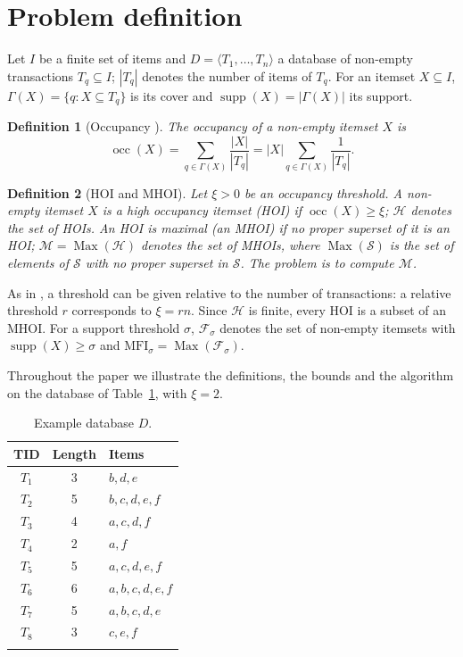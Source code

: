 \documentclass[pdflatex,sn-mathphys,Numbered]{sn-jnl}
\theoremstyle{thmstyleone}
\theoremstyle{thmstyletwo}
\theoremstyle{thmstylethree}
\newtheorem{definition}{Definition}
\newcommand{\supp}{\operatorname{supp}}
\newcommand{\occ}{\operatorname{occ}}
\newcommand{\HOI}{\mathcal{H}}
\newcommand{\MHOI}{\mathcal{M}}
\newcommand{\FI}{\mathcal{F}}
\newcommand{\MFI}{\mathrm{MFI}}
\newcommand{\Max}{\operatorname{Max}}
\begin{document}
\section{Problem definition}\label{sec:problem}

Let $I$ be a finite set of items and $D = \langle T_1, \dots, T_n \rangle$ a database of non-empty transactions $T_q \subseteq I$; $|T_q|$ denotes the number of items of $T_q$. For an itemset $X \subseteq I$, $\Gamma(X) = \{ q : X \subseteq T_q \}$ is its cover and $\supp(X) = |\Gamma(X)|$ its support.

\begin{definition}[Occupancy {\cite{deng2020hoi}}]\label{def:occ}
The occupancy of a non-empty itemset $X$ is
\begin{equation}\label{eq:occ}
\occ(X) = \sum_{q \in \Gamma(X)} \frac{|X|}{|T_q|} = |X| \sum_{q \in \Gamma(X)} \frac{1}{|T_q|}.
\end{equation}
\end{definition}

\begin{definition}[HOI and MHOI]\label{def:mhoi}
Let $\xi > 0$ be an occupancy threshold. A non-empty itemset $X$ is a high occupancy itemset (HOI) if $\occ(X) \ge \xi$; $\HOI$ denotes the set of HOIs. An HOI is maximal (an MHOI) if no proper superset of it is an HOI; $\MHOI = \Max(\HOI)$ denotes the set of MHOIs, where $\Max(\mathcal{S})$ is the set of elements of $\mathcal{S}$ with no proper superset in $\mathcal{S}$. The problem is to compute $\MHOI$.
\end{definition}

As in \cite{deng2020hoi}, a threshold can be given relative to the number of transactions: a relative threshold $r$ corresponds to $\xi = r n$. Since $\HOI$ is finite, every HOI is a subset of an MHOI. For a support threshold $\sigma$, $\FI_\sigma$ denotes the set of non-empty itemsets with $\supp(X) \ge \sigma$ and $\MFI_\sigma = \Max(\FI_\sigma)$.

Throughout the paper we illustrate the definitions, the bounds and the algorithm on the database of Table~\ref{tab:example}, with $\xi = 2$.

\begin{table}[t]
\caption{Example database $D$.}\label{tab:example}
\centering
\footnotesize
\begin{tabular}{@{}ccl@{}}
\toprule
TID & Length & Items \\
\midrule
$T_1$ & 3 & $b, d, e$ \\
$T_2$ & 5 & $b, c, d, e, f$ \\
$T_3$ & 4 & $a, c, d, f$ \\
$T_4$ & 2 & $a, f$ \\
$T_5$ & 5 & $a, c, d, e, f$ \\
$T_6$ & 6 & $a, b, c, d, e, f$ \\
$T_7$ & 5 & $a, b, c, d, e$ \\
$T_8$ & 3 & $c, e, f$ \\
\botrule
\end{tabular}
\end{table}
\end{document}
